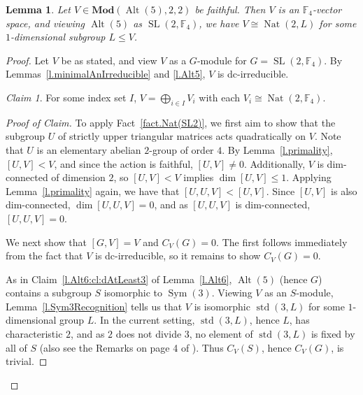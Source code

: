 \documentclass[a4paper, 11pt]{amsart}
\theoremstyle{plain}
\newtheorem{lemma}[theorem]{Lemma}
\theoremstyle{definition}
\theoremstyle{remark}
\newtheorem{claim}{Claim}
\newenvironment{proofclaim}[1][Proof of Claim]{\begin{proof}[#1]\renewcommand{\qedsymbol}{$\lozenge$}}{\end{proof}}
\DeclareMathOperator{\Sym}{Sym}
\DeclareMathOperator{\Alt}{Alt}
\DeclareMathOperator{\std}{std}
\DeclareMathOperator{\SL}{SL}
\DeclareMathOperator{\Nat}{Nat}
\newcommand{\Mod}{\mathbf{Mod}}
\newcommand{\bF}{\mathbb{F}}
\begin{document}
\begin{lemma}\label{l.Alt5Recognition}
    Let $V\in \Mod(\Alt(5),2,2)$ be faithful. Then $V$ is an $\bF_4$-vector space, and viewing $\Alt(5)$ as $\SL(2,\bF_4)$, we have $V\cong \Nat(2, L)$ for some $1$-dimensional subgroup $L\le V$.
\end{lemma}
\begin{proof}
Let $V$ be as stated, and view $V$ as a  $G$-module for $G =  \SL(2,\bF_4)$.
By Lemmas~\ref{l.minimalAnIrreducible} and \ref{l.Alt5}, $V$ is dc-irreducible. 

\begin{claim}
For some index set $I$, $V= \bigoplus_{i\in I} V_i$ with each $V_i \cong \Nat(2,\bF_4)$.
\end{claim}
\begin{proofclaim}
To apply Fact~\ref{fact.Nat(SL2)}, we first aim to show that the subgroup $U$ of strictly upper triangular matrices  acts quadratically on $V$. Note that $U$ is an elementary abelian $2$-group of order $4$. By Lemma~\ref{l.primality}, $[U,V] < V$, and since the action is faithful, $[U,V] \neq 0$. Additionally, $V$ is dim-connected of dimension $2$, so $[U,V] < V$ implies $\dim [U,V] \le 1$. Applying Lemma~\ref{l.primality} again, we have that $[U,U,V] < [U,V]$. Since $[U,V]$ is also dim-connected,  $\dim [U,U,V] =0$, and as  $[U,U,V]$ is dim-connected, $[U,U,V] = 0$. 

We next show that  $[G,V] = V$ and $C_V(G) = 0$. The first follows immediately from the fact that $V$ is dc-irreducible, so it remains to show $C_V(G)=0$.

As in Claim~\ref{l.Alt6:cl:dAtLeast3} of Lemma~\ref{l.Alt6}, $\Alt(5)$ (hence $G$) contains a subgroup $S$ isomorphic to $\Sym(3)$. Viewing $V$ as an $S$-module, Lemma~\ref{l.Sym3Recognition} tells us that $V$ is isomorphic $\std(3,L)$ for some $1$-dimensional group $L$. In the current setting, $\std(3,L)$, hence $L$, has characteristic $2$, and as $2$ does not divide $3$, no element of $\std(3,L)$ is fixed by all of $S$ (also see the Remarks on page 4 of \cite{CDW23}). Thus  $C_V(S)$, hence $C_V(G)$, is trivial.
\end{proofclaim}


\end{proof}
\end{document}
